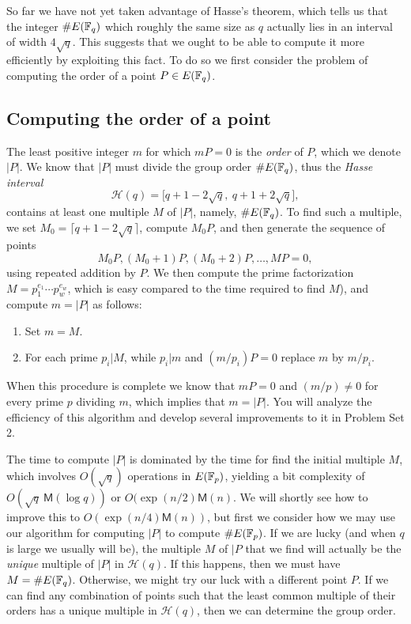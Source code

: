 So far we have not yet taken advantage of Hasse's theorem, which tells us that the integer $\#E(\mathbb{F}_q)$ which roughly the same size as $q$ actually lies in an interval of width $4\sqrt{q}$.
This suggests that we ought to be able to compute it more efficiently by exploiting this fact.
To do so we first consider the problem of computing the order of a point $P\in E(\mathbb{F}_q)$.

\subsection{Computing the order of a point}\label{sec:pointorder}

The least positive integer $m$ for which $mP=0$ is the \emph{order} of $P$, which we denote $|P|$.
We know that $|P|$ must divide the group order $\#E(\mathbb{F}_q)$, thus the \emph{Hasse interval}
\[
\mathcal{H}(q)=\bigl[q+1-2\sqrt{q},\ q+1+2\sqrt{q}\bigr],
\]
contains at least one multiple $M$ of $|P|$, namely, $\#E(\mathbb{F}_q)$.
To find such a multiple, we set $M_0=\lceil q+1-2\sqrt{q}\rceil$, compute $M_0P$, and then generate the sequence of points
\[
M_0P, (M_0+1)P, (M_0+2)P, \ldots, MP=0,
\]
using repeated addition by $P$. 
We then compute the prime factorization $M=p_1^{e_1}\cdots p_w^{e_w}$, which is easy compared to the time required to find $M$), and compute $m=|P|$ as follows:
\begin{enumerate}
\item Set $m=M$.
\item For each prime $p_i|M$, while $p_i|m$ and $(m/p_i)P=0$ replace $m$ by $m/p_i$.
\end{enumerate}
When this procedure is complete we know that $mP=0$ and $(m/p)\ne 0$ for every prime $p$ dividing $m$, which implies that $m=|P|$.
You will analyze the efficiency of this algorithm and develop several improvements to it in Problem Set 2.

The time to compute $|P|$ is dominated by the time for find the initial multiple $M$, which involves $O(\sqrt{q})$ operations in $E(\mathbb{F}_p)$, yielding a bit complexity of $O(\sqrt{q}\ \textsf{M}(\log q))$ or $O(\exp (n/2)\textsf{M}(n)$.
We will shortly see how to improve this to $O(\exp(n/4)\textsf{M}(n))$, but first we consider how we may use our algorithm for computing $|P|$ to compute $\#E(\mathbb{F}_p)$.
If we are lucky (and when $q$ is large we usually will be), the multiple $M$ of $|P$ that we find will actually be the \emph{unique} multiple of $|P|$ in $\mathcal{H}(q)$.
If this happens, then we must have $M=\#E(\mathbb{F}_q)$.  Otherwise, we might try our luck with a different point $P$.  If we can find any combination of points such that the least common multiple of their orders has a unique multiple in $\mathcal{H}(q)$, then we can determine the group order.


